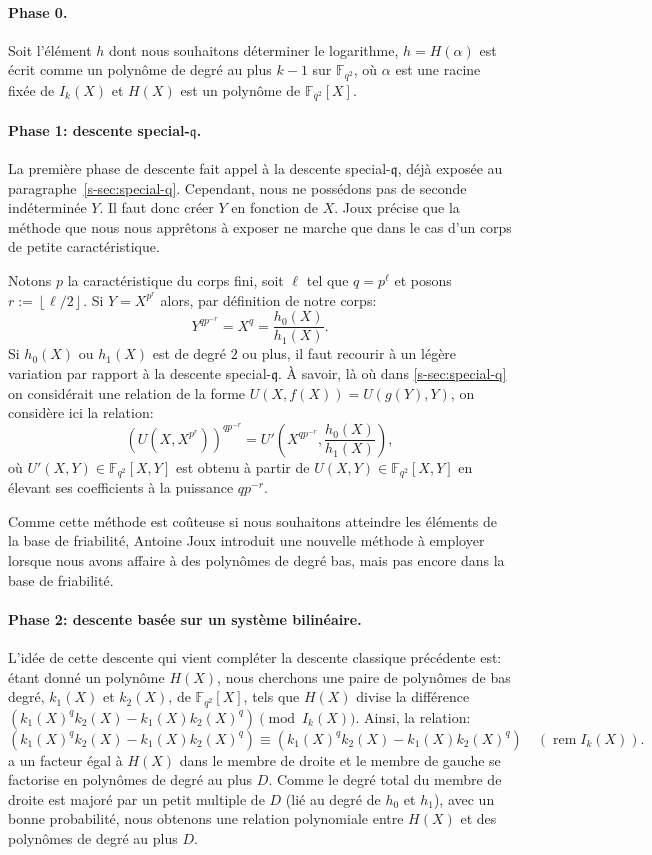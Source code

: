 \documentclass[a4paper, titlepage, 11pt]{article}
\theoremstyle{definition}
\theoremstyle{remark}
\def\gf #1{\mathbb{F}_{#1}}
\def\floor #1{\left\lfloor#1\right\rfloor}
\begin{document}
\paragraph{Phase 0.}Soit l'élément $h$ dont nous souhaitons déterminer le logarithme, $h = H(\alpha)$ est écrit comme un polynôme de degré au plus $k-1$ sur $\gf{q^2}$, où $\alpha$ est une racine fixée de $I_k(X)$ et $H(X)$ est un polynôme de $\gf{q^2}[X]$.

\paragraph{Phase 1: descente special-$\mathfrak{q}$.}La première phase de descente fait appel à la descente special-$\mathfrak{q}$, déjà exposée au paragraphe~\ref{s-sec:special-q}. Cependant, nous ne possédons pas de seconde indéterminée $Y$. Il faut donc créer $Y$ en fonction de $X$. Joux \cite{joux2013} précise que la méthode que nous nous apprêtons à exposer ne marche que dans le cas d'un corps de petite caractéristique.

Notons $p$ la caractéristique du corps fini, soit $\ell$ tel que $q = p^\ell$ et posons $r := \floor{\ell/2}$. Si $Y = X^{p^{r}}$ alors, par définition de notre corps:
$$Y^{qp^{-r}} = X^q = \frac{h_0(X)}{h_1(X)}.$$
Si $h_0(X)$ ou $h_1(X)$ est de degré $2$ ou plus, il faut recourir à un légère variation par rapport à la descente special-$\mathfrak{q}$. À savoir, là où dans \ref{s-sec:special-q} on considérait une relation de la forme $U(X,f(X)) = U(g(Y),Y)$, on considère ici la relation:
$${\left({U(X,X^{p^r})}\right)}^{qp^{-r}} = U'\left( X^{qp^{-r}},\frac{h_0(X)}{h_1(X)}\right),$$
où $U'(X,Y) \in \gf{q^2}[X,Y]$ est obtenu à partir de $U(X,Y)\in \gf{q^2}[X,Y]$ en élevant ses coefficients à la puissance $qp^{-r}$.

Comme cette méthode est coûteuse si nous souhaitons atteindre les éléments de la base de friabilité, Antoine Joux \cite{joux2013} introduit une nouvelle méthode à employer lorsque nous avons affaire à des polynômes de degré bas, mais pas encore dans la base de friabilité.

\paragraph{Phase 2: descente basée sur un système bilinéaire.}L'idée de cette descente qui vient compléter la descente classique précédente est: étant donné un polynôme $H(X)$, nous cherchons une paire de polynômes de bas degré, $k_1(X)$ et $k_2(X)$, de $\gf{q^2}[X]$, tels que $H(X)$ divise la différence $(k_1(X)^qk_2(X)-k_1(X)k_2(X)^q) \pmod{I_k(X)}$. Ainsi, la relation:
$$(k_1(X)^qk_2(X)-k_1(X)k_2(X)^q) \equiv (k_1(X)^qk_2(X)-k_1(X)k_2(X)^q) \quad (\operatorname{rem}I_k(X)).$$
a un facteur égal à $H(X)$ dans le membre de droite et le membre de gauche se factorise en polynômes de degré au plus $D$. Comme le degré total du membre de droite est majoré par un petit multiple de $D$ (lié au degré de $h_0$ et $h_1$), avec un bonne probabilité, nous obtenons une relation polynomiale entre $H(X)$ et des polynômes de degré au plus $D$.
\end{document}
